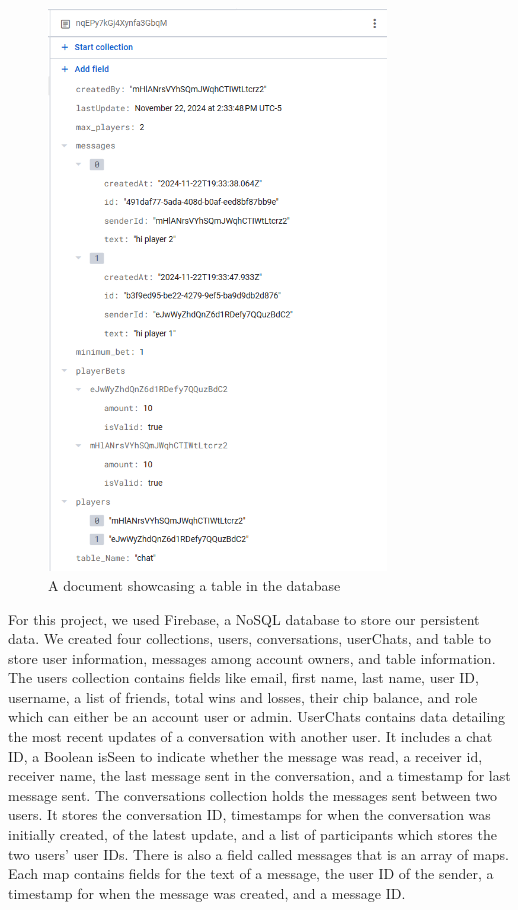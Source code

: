 \begin{figure}[!htb]
    \centering
    \includegraphics[width=0.8\textwidth]{figures/DB Screenshot table.png}
    \caption{A document showcasing a table in the database}
    \label{fig:tableDB}
\end{figure}

For this project, we used Firebase, a NoSQL database to store our persistent data. We created four collections, users, conversations, userChats, and table to store user information, messages among account owners, and table information. The users collection contains fields like email, first name, last name, user ID, username, a list of friends, total wins and losses, their chip balance, and role which can either be an account user or admin. UserChats contains data detailing the most recent updates of a conversation with another user. It includes a chat ID, a Boolean isSeen to indicate whether the message was read, a receiver id, receiver name, the last message sent in the conversation, and a timestamp for last message sent. The conversations collection holds the messages sent between two users. It stores the conversation ID, timestamps for when the conversation was initially created, of the latest update, and a list of participants which stores the two users’ user IDs. There is also a field called messages that is an array of maps. Each map contains fields for the text of a message, the user ID of the sender, a timestamp for when the message was created, and a message ID.

